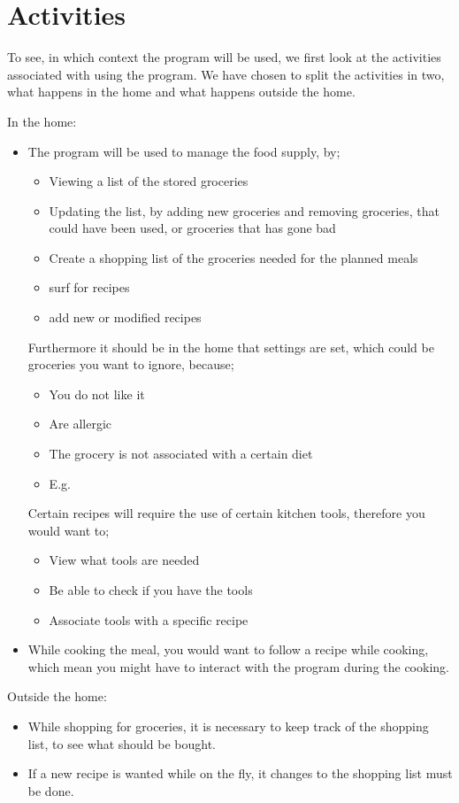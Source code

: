 \section{Activities}
To see, in which context the program will be used, we first look at the activities associated with using the program. We have chosen to split the activities in two, what happens in the home and what happens outside the home.

In the home:
\begin{itemize}
\item The program will be used to manage the food supply, by;
	\begin{itemize}
		\item Viewing a list of the stored groceries
		\item Updating the list, by adding new groceries and removing groceries, that could have been used, or groceries that has gone bad
		\item Create a shopping list of the groceries needed for the planned meals
		\item surf for recipes
		\item add new or modified recipes
	\end{itemize}
	Furthermore it should be in the home that settings are set, which could be groceries you want to ignore, because;
	\begin{itemize}
		\item You do not like it
		\item Are allergic
		\item The grocery is not associated with a certain diet
		\item E.g.
	\end{itemize}
	Certain recipes will require the use of certain kitchen tools, therefore you would want to;
	\begin{itemize}
		\item View what tools are needed
		\item Be able to check if you have the tools
		\item Associate tools with a specific recipe
	\end{itemize}
	\item While cooking the meal, you would want to follow a recipe while cooking, which mean you might have to interact with the program during the cooking.
\end{itemize}

Outside the home:
\begin{itemize}
\item While shopping for groceries, it is necessary to keep track of the shopping list, to see what should be bought.
\item If a new recipe is wanted while on the fly, it changes to the shopping list must be done.
\end{itemize}

